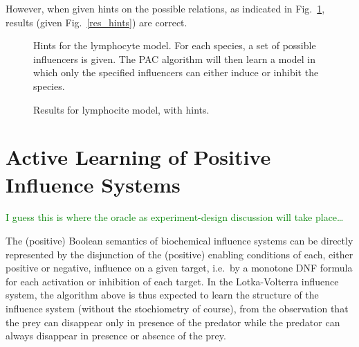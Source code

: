 \documentclass{llncs}
\newcommand{\sylvain}[1]{\textcolor{green}{#1}}
\begin{document}
However, when given hints on the possible relations, as indicated in
Fig.~\ref{hints}, results (given Fig.~\ref{res_hints}) are correct.

\begin{figure}
	
	\caption{Hints for the lymphocyte model. For each species, a set of possible influencers is given. The PAC algorithm will then learn a model in which only the specified influencers can either induce or inhibit the species.\label{hints}}
\end{figure}
\begin{figure}
	
	\caption{Results for lymphocite model, with hints.\label{hints.res}}
\end{figure}


\section{Active Learning of Positive Influence Systems}
\label{sec:oracles}

\sylvain{I guess this is where the oracle as experiment-design discussion will
take place\dots}

The (positive) Boolean semantics of biochemical influence systems
can be directly represented by the disjunction of the (positive) enabling conditions of each, either positive or negative, influence on a given target,
i.e.~by a monotone DNF formula for each activation or inhibition of each target.
In the Lotka-Volterra influence system, the algorithm above is thus expected to learn the structure of the influence system
(without the stochiometry of course),
from the observation that the prey can disappear only in presence of the predator
while the predator can always disappear in presence or absence of the prey.
\end{document}
